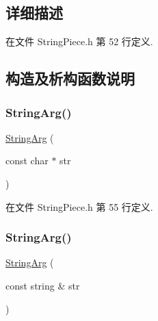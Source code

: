 \subsection{详细描述}


在文件 String\+Piece.\+h 第 52 行定义.



\subsection{构造及析构函数说明}
\mbox{\label{classmuduo_1_1StringArg_a1be46971883a89d096eb537b2b4b289e}} 
\subsubsection{\texorpdfstring{String\+Arg()}{StringArg()}\hspace{0.1cm}{\footnotesize\ttfamily [1/2]}}
{\footnotesize\ttfamily \hyperlink{classmuduo_1_1StringArg}{String\+Arg} (\begin{DoxyParamCaption}\item[{const char $\ast$}]{str }\end{DoxyParamCaption})\hspace{0.3cm}{\ttfamily [inline]}}



在文件 String\+Piece.\+h 第 55 行定义.

\mbox{\label{classmuduo_1_1StringArg_ad7592b760513b12bbe0e537fc89c2d30}} 
\subsubsection{\texorpdfstring{String\+Arg()}{StringArg()}\hspace{0.1cm}{\footnotesize\ttfamily [2/2]}}
{\footnotesize\ttfamily \hyperlink{classmuduo_1_1StringArg}{String\+Arg} (\begin{DoxyParamCaption}\item[{const string \&}]{str }\end{DoxyParamCaption})\hspace{0.3cm}{\ttfamily [inline]}}



